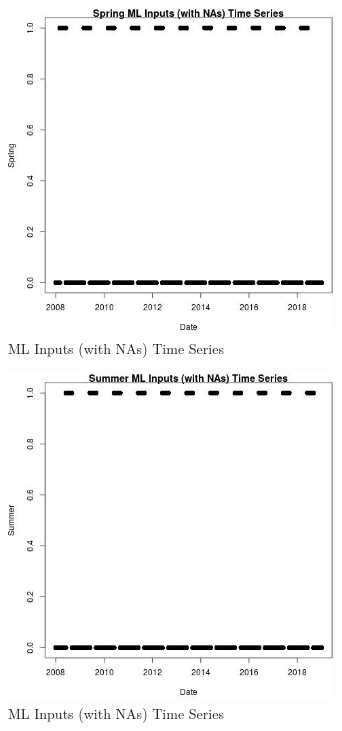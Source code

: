 \begin{figure} 
\centering  
\includegraphics[width=0.77\textwidth]{Code_Outputs/Report_ML_input_PM25_Step4_part_f_de_duplicated_aves_prioritize_24hr_obswNAs_SpringvDate.jpg} 
\caption{\label{fig:Report_ML_input_PM25_Step4_part_f_de_duplicated_aves_prioritize_24hr_obswNAsSpringvDate}ML Inputs (with NAs) Time Series} 
\end{figure} 
 

\begin{figure} 
\centering  
\includegraphics[width=0.77\textwidth]{Code_Outputs/Report_ML_input_PM25_Step4_part_f_de_duplicated_aves_prioritize_24hr_obswNAs_SummervDate.jpg} 
\caption{\label{fig:Report_ML_input_PM25_Step4_part_f_de_duplicated_aves_prioritize_24hr_obswNAsSummervDate}ML Inputs (with NAs) Time Series} 
\end{figure} 
 

